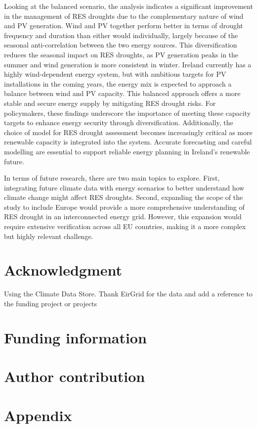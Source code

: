 \documentclass[a4paper, 11pt]{article}
\begin{document}
Looking at the balanced scenario, the analysis indicates a significant improvement in the management of RES droughts due to the complementary nature of wind and PV generation. Wind and PV together perform better in terms of drought frequency and duration than either would individually, largely because of the seasonal anti-correlation between the two energy sources. This diversification reduces the seasonal impact on RES droughts, as PV generation peaks in the summer and wind generation is more consistent in winter. Ireland currently has a highly wind-dependent energy system, but with ambitious targets for PV installations in the coming years, the energy mix is expected to approach a balance between wind and PV capacity. This balanced approach offers a more stable and secure energy supply by mitigating RES drought risks. For policymakers, these findings underscore the importance of meeting these capacity targets to enhance energy security through diversification. Additionally, the choice of model for RES drought assessment becomes increasingly critical as more renewable capacity is integrated into the system. Accurate forecasting and careful modelling are essential to support reliable energy planning in Ireland’s renewable future.

In terms of future research, there are two main topics to explore. First, integrating future climate data with energy scenarios to better understand how climate change might affect RES droughts. Second, expanding the scope of the study to include Europe would provide a more comprehensive understanding of RES drought in an interconnected energy grid. However, this expansion would require extensive verification across all EU countries, making it a more complex but highly relevant challenge.

\newpage
\section{Acknowledgment}
Using the Climate Data Store. Thank EirGrid for the data and add a reference to the funding project or projects

\section{Funding information}

\section{Author contribution}



\newpage
\section*{Appendix}
\end{document}
